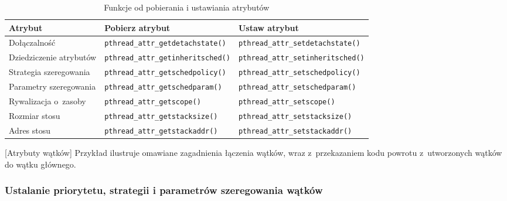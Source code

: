 \begin{table}[h!]
\centering
\caption{Funkcje od pobierania i ustawiania atrybutów}
\setlength{\arrayrulewidth}{1pt}
\setlength{\tabcolsep}{6pt}
\renewcommand{\arraystretch}{1.2}
\begin{tabular}{ |p{}|p{}|p{}| }
\hline \rowcolor{gray}
\textbf{Atrybut} & \textbf{Pobierz atrybut} & \textbf{Ustaw atrybut} \\ \hline
Dołączalność & \mbox{\lstinline[style=MyCStyle]{pthread_attr_getdetachstate()}} & \mbox{\lstinline[style=MyCStyle]{pthread_attr_setdetachstate()}} \\ \hline 
Dziedziczenie atrybutów & \mbox{\lstinline[style=MyCStyle]{pthread_attr_getinheritsched()}} & \mbox{\lstinline[style=MyCStyle]{pthread_attr_setinheritsched()}} \\ \hline 
Strategia szeregowania & \mbox{\lstinline[style=MyCStyle]{pthread_attr_getschedpolicy()}} & \mbox{\lstinline[style=MyCStyle]{pthread_attr_setschedpolicy()}} \\ \hline 
Parametry szeregowania & \mbox{\lstinline[style=MyCStyle]{pthread_attr_getschedparam()}} & \mbox{\lstinline[style=MyCStyle]{pthread_attr_setschedparam()}} \\ \hline 
Rywalizacja o~zasoby & \mbox{\lstinline[style=MyCStyle]{pthread_attr_getscope()}} & \mbox{\lstinline[style=MyCStyle]{pthread_attr_setscope()}} \\ \hline 
Rozmiar stosu & \mbox{\lstinline[style=MyCStyle]{pthread_attr_getstacksize()}} & \mbox{\lstinline[style=MyCStyle]{pthread_attr_setstacksize()}} \\ \hline 
Adres stosu & \mbox{\lstinline[style=MyCStyle]{pthread_attr_getstackaddr()}} & \mbox{\lstinline[style=MyCStyle]{pthread_attr_setstackaddr()}} \\ \hline 
\end{tabular}
\label{tab:atrybuty2}
\end{table}


\begin{example}{[Atrybuty wątków]}
Przykład ilustruje omawiane zagadnienia łączenia wątków, wraz z~przekazaniem kodu powrotu z~utworzonych wątków do wątku głównego. 


\end{example} 

\subsubsection{Ustalanie priorytetu, strategii i parametrów szeregowania wątków}


